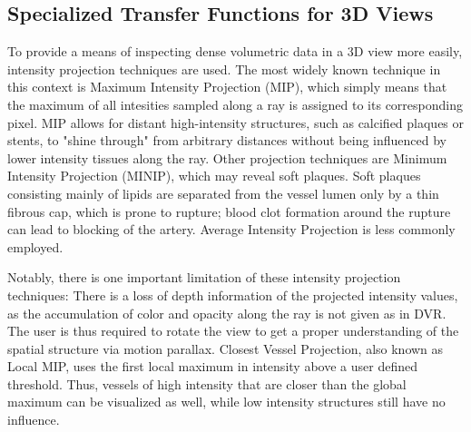 \subsection*{Specialized Transfer Functions for 3D Views}

To provide a means of inspecting dense volumetric data in a 3D view more easily, intensity projection techniques are used. The most widely known technique in this context is Maximum Intensity Projection (MIP), which simply means that the maximum of all intesities sampled along a ray is assigned to its corresponding pixel. MIP allows for distant high-intensity structures, such as calcified plaques or stents, to "shine through" from arbitrary distances without being influenced by lower intensity tissues along the ray. Other projection techniques are Minimum Intensity Projection (MINIP), which may reveal soft plaques. Soft plaques consisting mainly of lipids are separated from the vessel lumen only by a thin fibrous cap, which is prone to rupture; blood clot formation around the rupture can lead to blocking of the artery. Average Intensity Projection is less commonly employed. 

Notably, there is one important limitation of these intensity projection techniques: There is a loss of depth information of the projected intensity values, as the accumulation of color and opacity along the ray is not given as in DVR. The user is thus required to rotate the view to get a proper understanding of the spatial structure via motion parallax.
Closest Vessel Projection, also known as Local MIP, uses the first local maximum in intensity above a user defined threshold. Thus, vessels of high intensity that are closer than the global maximum can be visualized as well, while low intensity structures still have no influence.

